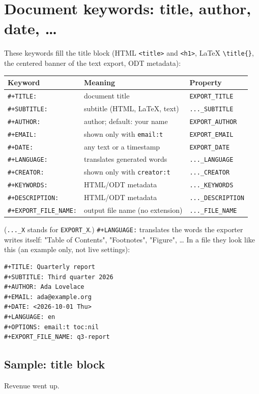 \section{Document keywords: title, author, date, \ldots{}}
\label{sec:org74aee5d}
These keywords fill the title block (HTML \texttt{<title>} and \texttt{<h1>}, \LaTeX{}
\texttt{\textbackslash{}title\{\}}, the centered banner of the text export, ODT metadata):

\begin{center}
\begin{tabular}{lll}
Keyword & Meaning & Property\\
\hline
\texttt{\#+TITLE:} & document title & \texttt{EXPORT\_TITLE}\\
\texttt{\#+SUBTITLE:} & subtitle (HTML, \LaTeX{}, text) & \texttt{...\_SUBTITLE}\\
\texttt{\#+AUTHOR:} & author; default: your name & \texttt{EXPORT\_AUTHOR}\\
\texttt{\#+EMAIL:} & shown only with \texttt{email:t} & \texttt{EXPORT\_EMAIL}\\
\texttt{\#+DATE:} & any text or a timestamp & \texttt{EXPORT\_DATE}\\
\texttt{\#+LANGUAGE:} & translates generated words & \texttt{...\_LANGUAGE}\\
\texttt{\#+CREATOR:} & shown only with \texttt{creator:t} & \texttt{...\_CREATOR}\\
\texttt{\#+KEYWORDS:} & HTML/ODT metadata & \texttt{...\_KEYWORDS}\\
\texttt{\#+DESCRIPTION:} & HTML/ODT metadata & \texttt{...\_DESCRIPTION}\\
\texttt{\#+EXPORT\_FILE\_NAME:} & output file name (no extension) & \texttt{...\_FILE\_NAME}\\
\end{tabular}
\end{center}

(\texttt{...\_X} stands for \texttt{EXPORT\_X}.) \texttt{\#+LANGUAGE:} translates the words the
exporter writes itself: "Table of Contents", "Footnotes", "Figure", \ldots{}
In a file they look like this (an example only, not live settings):

\begin{verbatim}
#+TITLE: Quarterly report
#+SUBTITLE: Third quarter 2026
#+AUTHOR: Ada Lovelace
#+EMAIL: ada@example.org
#+DATE: <2026-10-01 Thu>
#+LANGUAGE: en
#+OPTIONS: email:t toc:nil
#+EXPORT_FILE_NAME: q3-report
\end{verbatim}
\subsection{Sample: title block}
\label{sec:org14f7a8f}
Revenue went up.
